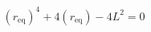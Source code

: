 \documentclass[preview]{standalone}
\begin{document}
\begin{align*}
(r_{\text{eq}})^4+4(r_{\text{eq}})-4L^2=0
\end{align*}
\end{document}
